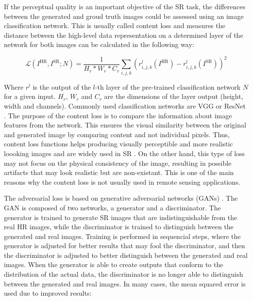         If the perceptual quality is an important objective of the SR task, the differences between the generated and groud truth images could be assessed using an image classification network. This is usually called content loss and measures the distance between the high-level data representation on a determined layer of the network for both images can be calculated in the following way:

        \begin{equation}
            \mathcal{L}(I^{\text{HR}}, I^{\text{SR}}; N) = \frac{1}{H_r*W_r*C_r}\sum_{i,j,k}(r^{l}_{i,j,k}(I^{\text{HR}}) - r^{l}_{i,j,k}(I^{\text{SR}}))^2
        \end{equation}

        Where $r^{l}$ is the output of the $l$-th layer of the pre-trained classification network $N$ for a given input. $H_r$, $W_r$ and $C_r$ are the dimensions of the layer output (height, width and channels). 
        Commonly used classification networks are VGG \cite{simonyan2015deep} or ResNet \cite{he2015deep}.
        The purpose of the content loss is to compare the information about image features from the network. This ensures the visual similarity between the original and generated image by comparing content and not individual pixels. Thus, content loss functions helps producing visually perceptible and more realistic loooking images and are widely used in SR \cite{ledig2017photorealistic,wang2018recovering}. On the other hand, this type of loss may not focus on the physical consistency of the image, resulting in possible artifacts that may look realistic but are non-existant. This is one of the main reasons why the content loss is not usually used in remote sensing applications.

        The adversarial loss is based on generative adversarial networks (GANs) \cite{goodfellow2014generative}. The GAN is composed of two networks, a generator and a discriminator. The generator is trained to generate SR images that are indistinguishable from the real HR images, while the discriminator is trained to distinguish between the generated and real images. 
        Training is performed in sequencial steps, where the generator is adjusted for better results that may fool the discriminator, and then the discriminator is adjusted to better distinguish between the generated and real images.
        When the generator is able to create outputs that conform to the distribution of the actual data, the discriminator is no longer able to distinguish between the generated and real images. In many cases, the mean squared error is used due to improved results: 

